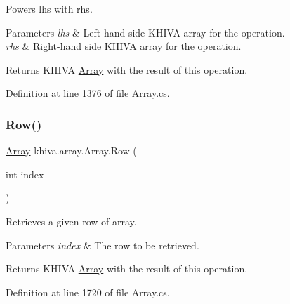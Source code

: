 Powers lhs with rhs. 


\begin{DoxyParams}{Parameters}
{\em lhs} & Left-\/hand side K\+H\+I\+VA array for the operation.\\
\hline
{\em rhs} & Right-\/hand side K\+H\+I\+VA array for the operation.\\
\hline
\end{DoxyParams}
\begin{DoxyReturn}{Returns}
K\+H\+I\+VA \mbox{\hyperlink{classkhiva_1_1array_1_1_array}{Array}} with the result of this operation.
\end{DoxyReturn}


Definition at line 1376 of file Array.\+cs.

\mbox{\label{classkhiva_1_1array_1_1_array_a5d233225d9134829d619bdabbdffd086}} 
\subsubsection{\texorpdfstring{Row()}{Row()}}
{\footnotesize\ttfamily \mbox{\hyperlink{classkhiva_1_1array_1_1_array}{Array}} khiva.\+array.\+Array.\+Row (\begin{DoxyParamCaption}\item[{int}]{index }\end{DoxyParamCaption})\hspace{0.3cm}{\ttfamily [inline]}}



Retrieves a given row of array. 


\begin{DoxyParams}{Parameters}
{\em index} & The row to be retrieved.\\
\hline
\end{DoxyParams}
\begin{DoxyReturn}{Returns}
K\+H\+I\+VA \mbox{\hyperlink{classkhiva_1_1array_1_1_array}{Array}} with the result of this operation.
\end{DoxyReturn}


Definition at line 1720 of file Array.\+cs.

\mbox{\label{classkhiva_1_1array_1_1_array_a510cc22793c427195b392c0c1b787a53}} 
